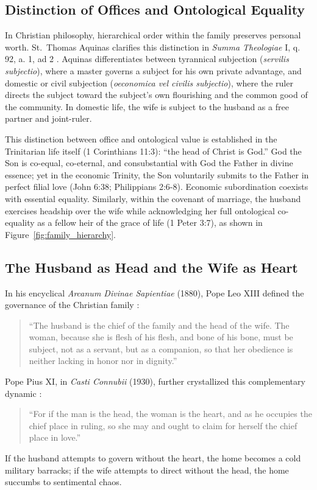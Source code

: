\documentclass[11pt,twocolumn]{article}
\begin{document}
\subsection{Distinction of Offices and Ontological Equality}
In Christian philosophy, hierarchical order within the family preserves personal worth. St.~Thomas Aquinas clarifies this distinction in \textit{Summa Theologiae} I, q. 92, a. 1, ad 2 \cite{aquinas_summa}. Aquinas differentiates between tyrannical subjection (\textit{servilis subjectio}), where a master governs a subject for his own private advantage, and domestic or civil subjection (\textit{oeconomica vel civilis subjectio}), where the ruler directs the subject toward the subject's own flourishing and the common good of the community. In domestic life, the wife is subject to the husband as a free partner and joint-ruler.

This distinction between office and ontological value is established in the Trinitarian life itself (1 Corinthians 11:3): ``the head of Christ is God.'' God the Son is co-equal, co-eternal, and consubstantial with God the Father in divine essence; yet in the economic Trinity, the Son voluntarily submits to the Father in perfect filial love (John 6:38; Philippians 2:6-8). Economic subordination coexists with essential equality. Similarly, within the covenant of marriage, the husband exercises headship over the wife while acknowledging her full ontological co-equality as a fellow heir of the grace of life (1 Peter 3:7), as shown in Figure~\ref{fig:family_hierarchy}.

\subsection{The Husband as Head and the Wife as Heart}
In his encyclical \textit{Arcanum Divinae Sapientiae} (1880), Pope Leo XIII defined the governance of the Christian family \cite{leo_arcanum}:
\begin{quote}
``The husband is the chief of the family and the head of the wife. The woman, because she is flesh of his flesh, and bone of his bone, must be subject, not as a servant, but as a companion, so that her obedience is neither lacking in honor nor in dignity.''
\end{quote}
Pope Pius XI, in \textit{Casti Connubii} (1930), further crystallized this complementary dynamic \cite{pius_casti}:
\begin{quote}
``For if the man is the head, the woman is the heart, and as he occupies the chief place in ruling, so she may and ought to claim for herself the chief place in love.''
\end{quote}
If the husband attempts to govern without the heart, the home becomes a cold military barracks; if the wife attempts to direct without the head, the home succumbs to sentimental chaos.
\end{document}
